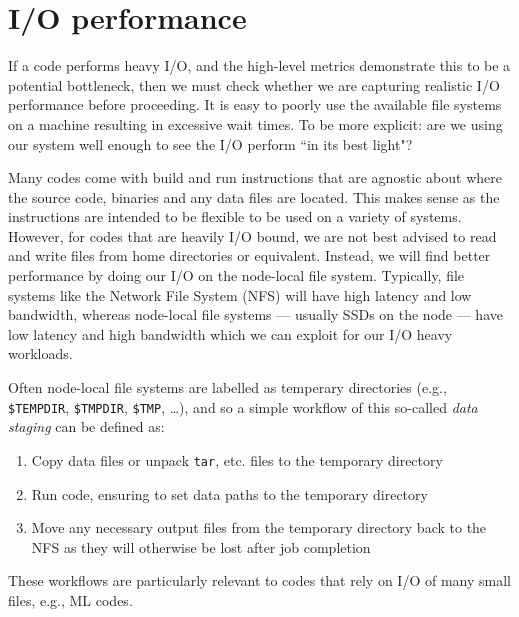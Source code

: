 \section{I/O performance}
\label{section:tailoring:io}


If a code performs heavy I/O, and the high-level metrics demonstrate this to be
a potential bottleneck, then we must check whether we are capturing realistic
I/O performance before proceeding. It is easy to poorly use the available file
systems on a machine resulting in excessive wait times. To be more explicit:
are we using our system well enough to see the I/O perform ``in its best
light"? 

Many codes come with build and run instructions that are agnostic about where
the source code, binaries and any data files are located. This makes sense as
the instructions are intended to be flexible to be used on a variety of
systems. However, for codes that are heavily I/O bound, we are not best advised
to read and write files from home directories or equivalent. Instead, we will
find better performance by doing our I/O on the node-local file system.
Typically, file systems like the Network File System (NFS) will have high
latency and low bandwidth, whereas node-local file systems --- usually SSDs on
the node --- have low latency and high bandwidth which we can exploit for our
I/O heavy workloads.

Often node-local file systems are labelled as temperary directories (e.g.,
\texttt{\$TEMPDIR}, \texttt{\$TMPDIR}, \texttt{\$TMP}, \ldots), and so a simple
workflow of this so-called \emph{data staging} can be defined as:
\begin{enumerate}
  \item Copy data files or unpack \texttt{tar}, etc. files to the temporary directory
  \item Run code, ensuring to set data paths to the temporary directory
  \item Move any necessary output files from the temporary directory back to the NFS as they will otherwise be lost after job completion
\end{enumerate}
These workflows are particularly relevant to codes that rely on I/O of many
small files, e.g., ML codes.

